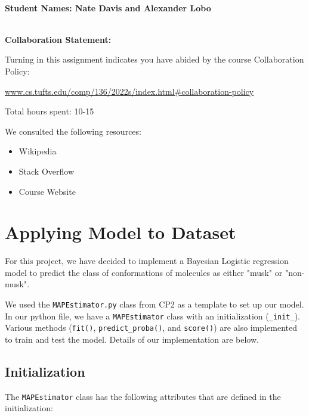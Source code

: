 \documentclass[12pt]{article}
\begin{document}
~~\\ %

\begin{center}
{\Large{\bf Student Names: Nate Davis and Alexander Lobo}}
\end{center}

~~\\ %

{\Large{\bf Collaboration Statement:}}

Turning in this assignment indicates you have abided by the course Collaboration Policy:

\url{www.cs.tufts.edu/comp/136/2022s/index.html#collaboration-policy}

Total hours spent: 10-15

We consulted the following resources:
\begin{itemize}
\item Wikipedia
\item Stack Overflow
\item Course Website
\end{itemize}

\tableofcontents

\newpage

\section{Applying Model to Dataset}

For this project, we have decided to implement a Bayesian Logistic regression model to predict the class of conformations of molecules as either "musk" or "non-musk".

We used the \texttt{MAPEstimator.py} class from CP2 as a template to set up our model. In our python file, we have a \texttt{MAPEstimator} class with an initialization (\texttt{\_init\_}). Various methods (\texttt{fit()}, \texttt{predict\_proba()}, and \texttt{score()}) are also implemented to train and test the model. Details of our implementation are below.

\subsection{Initialization}

The \texttt{MAPEstimator} class has the following attributes that are defined in the initialization:
\end{document}
